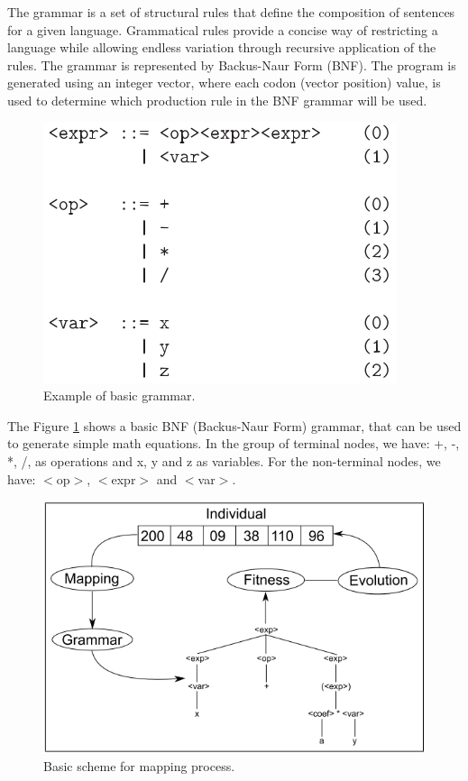 \documentclass[journal]{IEEEtran}
\begin{document}
	The grammar is a set of structural rules that define the composition of sentences for a given language. Grammatical rules provide a concise way of restricting a language while allowing endless variation through recursive application of the rules\cite{byrne2015optimising}. The grammar is represented by Backus-Naur Form (BNF). The program is generated using an integer vector, where each codon (vector position) value, is used to determine which production rule in the BNF grammar will be used.
	
	\begin{figure}[!htb]
		\centering
		\includegraphics[scale=.6]{figures/grammar.png}
		\caption{Example of basic grammar. \cite{ryan1998grammatical}}
		\label{fig:grammar}
	\end{figure}
	
	The Figure \ref{fig:grammar} shows a basic BNF (Backus-Naur Form) grammar, that can be used to generate simple math equations. In the group of terminal nodes, we have: +, -, *, /, as operations and x, y and z as variables. For the non-terminal nodes, we have: $<$op$>$, $<$expr$>$ and $<$var$>$.
	
	\begin{figure}[!htb]
		\centering
		\includegraphics[scale=.4]{figures/ge_algo.png}
		\caption{Basic scheme for mapping process. \cite{cerri2013grammatical}}
		\label{fig:ge_algo}
	\end{figure}
	
\end{document}
